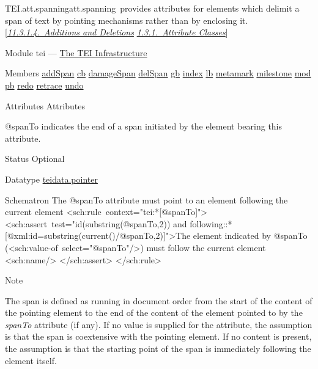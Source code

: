 \begin{reflist}
\item[]\begin{specHead}{TEI.att.spanning}{att.spanning} provides attributes for elements which delimit a span of text by pointing mechanisms rather than by enclosing it. [\textit{\hyperref[PHAD]{11.3.1.4.\ Additions and Deletions}} \textit{\hyperref[STECAT]{1.3.1.\ Attribute Classes}}]\end{specHead} 
    \item[{Module}]
  tei — \hyperref[ST]{The TEI Infrastructure}
    \item[{Members}]
  \hyperref[TEI.addSpan]{addSpan} \hyperref[TEI.cb]{cb} \hyperref[TEI.damageSpan]{damageSpan} \hyperref[TEI.delSpan]{delSpan} \hyperref[TEI.gb]{gb} \hyperref[TEI.index]{index} \hyperref[TEI.lb]{lb} \hyperref[TEI.metamark]{metamark} \hyperref[TEI.milestone]{milestone} \hyperref[TEI.mod]{mod} \hyperref[TEI.pb]{pb} \hyperref[TEI.redo]{redo} \hyperref[TEI.retrace]{retrace} \hyperref[TEI.undo]{undo}
    \item[{Attributes}]
  Attributes\hfil\\[-10pt]\begin{sansreflist}
    \item[@spanTo]
  indicates the end of a span initiated by the element bearing this attribute.
\begin{reflist}
    \item[{Status}]
  Optional
    \item[{Datatype}]
  \hyperref[TEI.teidata.pointer]{teidata.pointer}
    \item[{Schematron}]
  The @spanTo attribute must point to an element following the current element <sch:rule context="tei:*[@spanTo]"> <sch:assert test="id(substring(@spanTo,2)) and following::*[@xml:id=substring(current()/@spanTo,2)]">The element indicated by @spanTo (<sch:value-of select="@spanTo"/>) must follow the current element <sch:name/> </sch:assert> </sch:rule>
\end{reflist}  
\end{sansreflist}  
    \item[{Note}]
  \par
The span is defined as running in document order from the start of the content of the pointing element to the end of the content of the element pointed to by the {\itshape spanTo} attribute (if any). If no value is supplied for the attribute, the assumption is that the span is coextensive with the pointing element. If no content is present, the assumption is that the starting point of the span is immediately following the element itself.
\end{reflist}  
